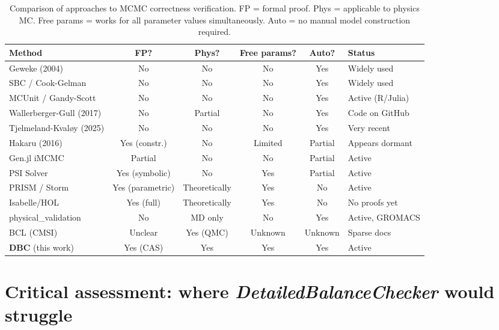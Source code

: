 \documentclass[11pt,a4paper]{article}
\newcommand{\DBC}{\textit{DetailedBalanceChecker}}
\begin{document}
\begin{table}[h]
  \centering
  \caption{Comparison of approaches to MCMC correctness verification.
    FP = formal proof.  Phys = applicable to physics MC.
    Free params = works for all parameter values simultaneously.
    Auto = no manual model construction required.}
  \label{tab:comparison}
  \footnotesize
  \renewcommand{\arraystretch}{1.2}
  \begin{tabular}{@{}P{3.2cm}ccccP{3.2cm}@{}}
    \toprule
    Method & FP? & Phys? & Free params? & Auto? & Status \\
    \midrule
    Geweke (2004) & No & No & No & Yes & Widely used \\
    SBC / Cook-Gelman & No & No & No & Yes & Widely used \\
    MCUnit / Gandy-Scott & No & No & No & Yes & Active (R/Julia) \\
    Wallerberger-Gull (2017) & No & Partial & No & Yes & Code on GitHub \\
    Tjelmeland-Kvaløy (2025) & No & No & No & Yes & Very recent \\
    Hakaru (2016) & Yes (constr.) & No & Limited & Partial & Appears dormant \\
    Gen.jl iMCMC & Partial & No & No & Partial & Active \\
    PSI Solver & Yes (symbolic) & No & Yes & Partial & Active \\
    PRISM / Storm & Yes (parametric) & Theoretically & Yes & No & Active \\
    Isabelle/HOL & Yes (full) & Theoretically & Yes & No & No proofs yet \\
    physical\_validation & No & MD only & No & Yes & Active, GROMACS \\
    BCL (CMSI) & Unclear & Yes (QMC) & Unknown & Unknown & Sparse docs \\
    \midrule
    \textbf{DBC} (this work) & Yes (CAS) & Yes & Yes & Yes & Active \\
    \bottomrule
  \end{tabular}
\end{table}

\section{Critical assessment: where \DBC{} would struggle}
\label{sec:criticisms}
\end{document}
